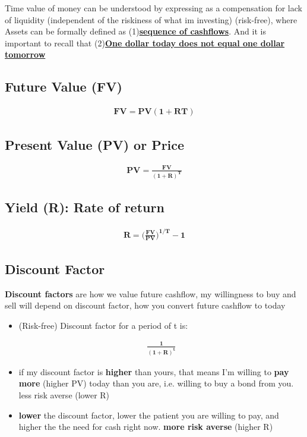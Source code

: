 Time value of money can be understood by expressing as a compensation for lack of liquidity (independent of the riskiness of what im investing) (risk-free), where
Assets can be formally defined as (1)\underline{\textbf{sequence of cashflows}}. And it is important to recall that (2)\underline{\textbf{One dollar today does not equal one dollar tomorrow}}

\begin{multicols}{2}

\subsection{Future Value (FV)}
\begin{gather*}
    \mathbf{FV = PV(1+RT)}
\end{gather*}

\subsection{Present Value (PV) or Price}
\begin{gather*}
    \mathbf{PV = \frac{FV}{(1+R)^T}}
\end{gather*}
       
\subsection{Yield (R): Rate of return}
\begin{gather*}
    \mathbf{R = \Big(\frac{FV}{PV}\Big)^{1/T}-1}
\end{gather*}

\subsection{Discount Factor}
\textbf{Discount factors} are how we value future cashflow, my willingness to buy and sell will depend on discount factor, how you convert future cashflow to today
\begin{itemize}
    \item (Risk-free) Discount factor for a period of t is:
    \begin{shaded}
        \begin{gather*}
            \mathbf{\frac{1}{(1+R)^t}}
        \end{gather*}
    \end{shaded}
    \item if my discount factor is \textbf{higher} than yours, that means I'm willing to \textbf{pay more} (higher PV) today than you are, i.e. willing to buy a bond from you. less risk averse (lower R)
    \item \textbf{lower} the discount factor, lower the patient you are willing to pay, and higher the the need for cash right now. \textbf{more risk averse} (higher R)
\end{itemize}


\end{multicols}
